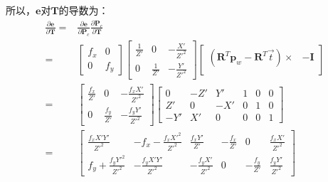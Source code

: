 \documentclass{article}
\begin{document}
所以，$\boldsymbol{e}$对$\boldsymbol{T}$的导数为：
\begin{equation}
	\begin{aligned}
		\frac{\partial{\boldsymbol{e}}}{\partial{\boldsymbol{T}}}  = & \frac{\partial{\boldsymbol{e}}}{\partial{\boldsymbol{P}_c}}  \frac{\partial{\boldsymbol{P}_c}}{\partial{\boldsymbol{T}}}\\ =& 
		\left[
		\begin{matrix}
		f_x & 0 \\
		0 & f_y 
		\end{matrix}
		\right]
		\left[ 
		\begin{matrix}
		\frac{1}{Z'}                                                 & 0                                                                                                                        & -\frac{X'}{Z'^2}    \\
		0                                                            & \frac{1}{Z'}                                                                                                             & -\frac{Y'}{Z'^2}    
		\end{matrix}
		\right]
		\left[
		\begin{matrix}
		(\boldsymbol{R}^T\boldsymbol{p}_w-\boldsymbol{R}^T\vec{t})\times & -\boldsymbol{I} \\
		\end{matrix}
		\right] \\=& 
		\left[
		\begin{matrix}
		\frac{f_x}{Z'}                                               & 0                                                                                                                        & -\frac{f_xX'}{Z'^2} \\
		0                                                            & \frac{f_y}{Z'}                                                                                                           & -\frac{f_yY'}{Z'^2} 
		\end{matrix}
		\right]
		\left[
		\begin{matrix}
		0                        & -Z'                       & Y'                  & 1               & 0               & 0                  \\
		Z'                       & 0                         & -X'                 & 0               & 1               & 0                  \\
		-Y'                      & X'                        & 0                   & 0               & 0               & 1                  
		\end{matrix}
		\right]\\=& 
		\left[
		\begin{matrix}
		\frac{f_xX'Y'}{Z'^2}     & -f_x-\frac{f_xX'^2}{Z'^2} & \frac{f_xY'}{Z'}    & -\frac{f_x}{Z'} & 0               & \frac{f_xX'}{Z'^2} \\
		f_y+\frac{f_yY'^2}{Z'^2} & -\frac{f_yX'Y'}{Z'^2}     & -\frac{f_yX'}{Z'^2} & 0               & -\frac{f_y}{Z'} & \frac{f_yY'}{Z'^2} 
		\end{matrix}
		\right]
	\end{aligned}
\end{equation}
\end{document}
